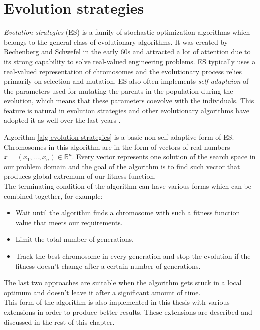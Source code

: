 \section{Evolution strategies} \label{evolution-strategies}
\textit{Evolution strategies} (ES) is a family of stochastic optimization algorithms which belongs to the general class of evolutionary algorithms. It was created by Rechenberg and Schwefel in the early 60s and attracted a lot of attention due to its strong capability to solve real-valued engineering problems. ES typically uses a real-valued representation of chromosomes and the evolutionary process relies primarily on selection and mutation. ES also often implements \textit{self-adaptaion} of the parameters used for mutating the parents in the population during the evolution, which means that these parameters coevolve with the individuals. This feature is natural in evolution strategies and other evolutionary algorithms have adopted it as well over the last years \cite{natural-computing-algorithms, introduction-to-evolutionary-computing}.

Algorithm \ref{alg-evolution-strategies} is a basic non-self-adaptive form of ES. Chromosomes in this algorithm are in the form of vectors of real numbers $x = (x_1,...,x_n) \in \mathbb{R}^n$. Every vector represents one solution of the search space in our problem domain and the goal of the algorithm is to find such vector that produces global extremum of our fitness function.\\
The terminating condition of the algorithm can have various forms which can be combined together, for example:

 \begin{itemize}
    \item Wait until the algorithm finds a chromosome with such a fitness function value that meets our requirements.
    \item Limit the total number of generations.
    \item Track the best chromosome in every generation and stop the evolution if the fitness doesn't change after a certain number of generations.
 \end{itemize}

 The last two approaches are suitable when the algorithm gets stuck in a local optimum and doesn't leave it after a significant amount of time.\\
This form of the algorithm is also implemented in this thesis with various extensions in order to produce better results. These extensions are described and discussed in the rest of this chapter.

